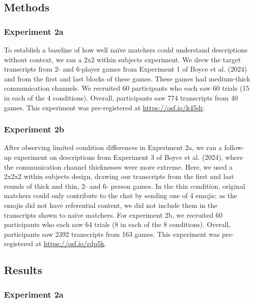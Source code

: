 \documentclass[10pt, letterpaper]{article}
\begin{document}
\subsection{Methods}\label{methods-1}

\subsubsection{Experiment 2a}\label{experiment-2a}

To establish a baseline of how well naïve matchers could understand
descriptions without context, we ran a 2x2 within subjects experiment.
We drew the target transcripts from 2- and 6-player games from
Experiment 1 of Boyce et al. (2024) and from the first and last blocks
of these games. These games had medium-thick communication channels. We
recruited 60 participants who each saw 60 trials (15 in each of the 4
conditions). Overall, participants saw 774 transcripts from 40 games.
This experiment was pre-registered at \url{https://osf.io/k45dr}.

\subsubsection{Experiment 2b}\label{experiment-2b}

After observing limited condition differences in Experiment 2a, we ran a
follow-up experiment on descriptions from Experiment 3 of Boyce et al.
(2024), where the communication channel thicknesses were more extreme.
Here, we used a 2x2x2 within subjects design, drawing our transcripts
from the first and last rounds of thick and thin, 2- and 6- person
games. In the thin condition, original matchers could only contribute to
the chat by sending one of 4 emojis; as the emojis did not have
referential content, we did not include them in the transcripts shown to
naïve matchers. For experiment 2b, we recruited 60 participants who each
saw 64 trials (8 in each of the 8 conditions). Overall, participants saw
2392 transcripts from 163 games. This experiment was pre-registered at
\url{https://osf.io/rdp5k}.

\subsection{Results}\label{results-1}

\subsubsection{Experiment 2a}\label{experiment-2a-1}
\end{document}
